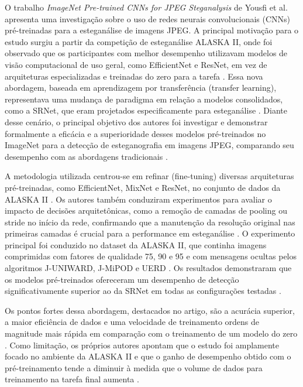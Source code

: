 \documentclass[12pt]{article}
\begin{document}
O trabalho \textit{ImageNet Pre-trained CNNs for JPEG Steganalysis} de Yousfi
et al. apresenta uma investigação sobre o uso de redes neurais convolucionais
(CNNs) pré-treinadas para a esteganálise de imagens JPEG. A principal motivação
para o estudo surgiu a partir da competição de esteganálise ALASKA II, onde foi
observado que os participantes com melhor desempenho utilizavam modelos de
visão computacional de uso geral, como EfficientNet e ResNet, em vez de
arquiteturas especializadas e treinadas do zero para a tarefa
\cite{fridrich2021EfficientNet}. Essa nova abordagem, baseada em aprendizagem
por transferência (transfer learning), representava uma mudança de paradigma em
relação a modelos consolidados, como a SRNet, que eram projetados
especificamente para esteganálise \cite{fridrich2021EfficientNet}. Diante desse
cenário, o principal objetivo dos autores foi investigar e demonstrar
formalmente a eficácia e a superioridade desses modelos pré-treinados no
ImageNet para a detecção de esteganografia em imagens JPEG, comparando seu
desempenho com as abordagens tradicionais \cite{fridrich2021EfficientNet}.

A metodologia utilizada centrou-se em refinar (fine-tuning) diversas
arquiteturas pré-treinadas, como EfficientNet, MixNet e ResNet, no conjunto de
dados da ALASKA II \cite{fridrich2021EfficientNet}. Os autores também
conduziram experimentos para avaliar o impacto de decisões arquitetônicas, como
a remoção de camadas de pooling ou stride no início da rede, confirmando que a
manutenção da resolução original nas primeiras camadas é crucial para a
performance em esteganálise \cite{fridrich2021EfficientNet}. O experimento
principal foi conduzido no dataset da ALASKA II, que continha imagens
comprimidas com fatores de qualidade 75, 90 e 95 e com mensagens ocultas pelos
algoritmos J-UNIWARD, J-MiPOD e UERD \cite{fridrich2021EfficientNet}. Os
resultados demonstraram que os modelos pré-treinados ofereceram um desempenho
de detecção significativamente superior ao da SRNet em todas as configurações
testadas \cite{fridrich2021EfficientNet}.

Os pontos fortes dessa abordagem, destacados no artigo, são a acurácia
superior, a maior eficiência de dados e uma velocidade de treinamento ordens de
magnitude mais rápida em comparação com o treinamento de um modelo do zero
\cite{fridrich2021EfficientNet}. Como limitação, os próprios autores apontam
que o estudo foi amplamente focado no ambiente da ALASKA II e que o ganho de
desempenho obtido com o pré-treinamento tende a diminuir à medida que o volume
de dados para treinamento na tarefa final aumenta
\cite{fridrich2021EfficientNet}.
\end{document}
